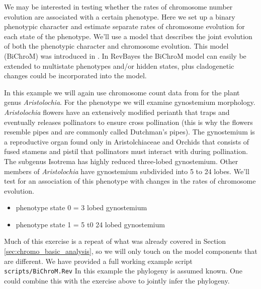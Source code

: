 We may be interested in testing whether the rates of chromosome number evolution
are associated with a certain phenotype.
Here we set up a binary phenotypic character and estimate separate rates of chromosome
evolution for each state of the phenotype. 
We'll use a model that describes the joint evolution of both the
phenotypic character and chromosome evolution. This model (BiChroM) was introduced in \citet{zenil2017testing}. In RevBayes the BiChroM model can easily be extended to multistate phenotypes and/or 
hidden states, plus cladogenetic changes could be incorporated into the model.

In this example we will again use chromosome count data from \citet{ohi2006molecular} for the plant 
genus \textit{Aristolochia}. 
For the phenotype we will examine gynostemium morphology. \textit{Aristolochia} flowers have an extensively 
modified perianth that traps and eventually releases pollinators to ensure cross pollination 
(this is why the flowers resemble pipes and are commonly called Dutchman's pipes). The gynostemium 
is a reproductive organ found only in Aristolchiaceae and Orchids that consists of fused stamens 
and pistil that pollinators must interact with during pollination. The subgenus Isotrema has highly
reduced three-lobed gynostemium. Other members of \textit{Aristolochia} have gynostemium subdivided into
5 to 24 lobes. We'll test for an association of this phenotype with changes in the rates of 
chromosome evolution. 
\begin{itemize}
\item phenotype state 0 = 3 lobed gynostemium
\item phenotype state 1 = 5 t0 24 lobed gynostemium
\end{itemize}
Much of this exercise is a repeat of what was already covered in Section \ref{sec:chromo_basic_analysis},
so we will only touch on the model components that are different.
We have provided a full working example script \texttt{scripts/BiChroM.Rev}
In this example the phylogeny is assumed known. One could combine this with the exercise above
to jointly infer the phylogeny.

\begin{figure}[h!]
\label{fig:bichrom_rates}
\end{figure}

